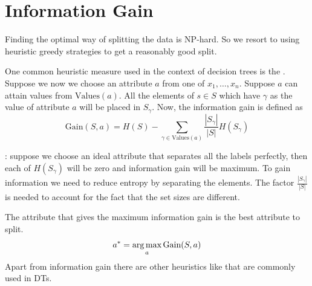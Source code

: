 \section{Information Gain}

Finding the optimal way of splitting the data is NP-hard. So we resort to using heuristic greedy strategies to get a reasonably good split. \\

\vspace{3mm}

One common heuristic measure used in the context of decision trees is the . \\

Suppose we now we choose an attribute $a$ from one of $x_1,\dots,x_n$. Suppose $a$ can attain values from $\text{Values}(a)$. All the elements of $s \in S$ which have $\gamma$ as the value of attribute $a$ will be placed in $S_\gamma$. Now, the information gain is defined as
$$
  \text{Gain}(S,a) = H(S) - \sum_{\gamma\in \text{Values}(a)}\frac{|S_\gamma|}{|S|}H(S_\gamma)
$$

 : suppose we choose an ideal attribute that separates all the labels perfectly, then each of $H(S_\gamma)$ will be zero and information gain will be maximum. To gain information we need to reduce entropy by separating the elements. The factor $\frac{|S_\gamma|}{|S|}$ is needed to account for the fact that the set sizes are different.

The attribute that gives the maximum information gain is the best attribute to split.
$$a^* = \operatorname*{arg\,max}_{a} \text{Gain}(S,a)$$
Apart from information gain there are other heuristics like  that are commonly used in DTs. \\

\vspace{4mm}

